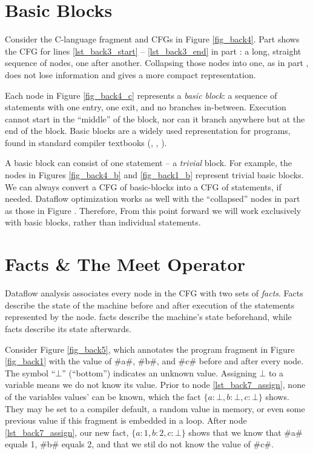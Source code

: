 \documentclass[12pt]{report}
\begin{document}
\section{Basic Blocks}
Consider the C-language fragment and CFGs in Figure
\ref{fig_back4}. Part  shows the CFG for lines
\ref{lst_back3_start} -- \ref{lst_back3_end} in part
: a long, straight sequence of nodes, one after
another. Collapsing those nodes into one, as in part
, does not lose information and gives a more
compact representation. 

\afterpage{\clearpage{}\clearpage}

Each node in Figure \ref{fig_back4_c} represents a \emph{basic block}:
a sequence of statements with one entry, one exit, and no branches
in-between. Execution cannot start in the ``middle'' of the block, nor
can it branch anywhere but at the end of the block. Basic blocks are a
widely used representation for programs, found in standard compiler
textbooks (\citep{AhoXX}, \citep{MunchXX}, \citep{AppelXX}).

A basic block can consist of one statement -- a \emph{trivial}
block. For example, the nodes in Figures \ref{fig_back4_b} and
\ref{fig_back1_b} represent trivial basic blocks. We can always
convert a CFG of basic-blocks into a CFG of statements, if needed.
Dataflow optimization works as well with the ``collapsed'' nodes in
part  as those in Figure
. Therefore, From this point forward we will work
exclusively with basic blocks, rather than individual statements.

\section{Facts \& The Meet Operator}
Dataflow analysis associates every node in the CFG with two sets of
\emph{facts}. Facts describe the state of the machine before and after
execution of the statements represented by the node. \In facts
describe the machine's state beforehand, while \out facts
describe its state afterwards.

\afterpage{\clearpage\clearpage}

Consider Figure \ref{fig_back5}, which annotates the program fragment
in Figure \ref{fig_back1} with the value of #a#, #b#, and #c# before
and after every node. The symbol ``$\bot$'' (``bottom'') indicates an
unknown value. Assigning $\bot$ to a variable means we do not know its
value. Prior to node \ref{lst_back7_assign}, none of the variables
values' can be known, which the fact $\{a : \bot,b : \bot,c : \bot\}$
shows.  They may be set to a compiler default, a random value in
memory, or even some previous value if this fragment is embedded in a
loop. After node \ref{lst_back7_assign}, our new fact, $\{a : 1,b : 2,c : \bot\}$
shows that we know that #a# equals 1, #b# equals 2, and that we stil do not know
the value of #c#.
\end{document}
